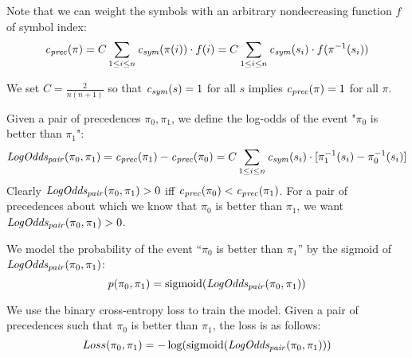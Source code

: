 Note that we can weight the symbols with an arbitrary nondecreasing function $f$ of symbol index:
$$
\CostPrec(\pi) =
C \sum_{1 \leq i \leq n} \CostSym(\pi(i)) \cdot f(i) =
C \sum_{1 \leq i \leq n} \CostSym(s_i) \cdot f(\inv{\pi}(s_i))
$$

We set $C = \frac{2}{n(n+1)}$ so that $\CostSym(s) = 1$ for all $s$ implies $\CostPrec(\pi) = 1$ for all $\pi$.

Given a pair of precedences $\pi_0, \pi_1$,
we define the log-odds of the event "$\pi_0$ is better than $\pi_1$":
$$
\CostPrecPair(\pi_0, \pi_1) =
\CostPrec(\pi_1) - \CostPrec(\pi_0) =
C \sum_{1 \leq i \leq n} \CostSym(s_i) \cdot [\inv{\pi_1}(s_i) - \inv{\pi_0}(s_i)]
$$
Clearly $\CostPrecPair(\pi_0, \pi_1) > 0$ iff $\CostPrec(\pi_0) < \CostPrec(\pi_1)$.
For a pair of precedences about which we know that $\pi_0$ is better than $\pi_1$,
we want $\CostPrecPair(\pi_0, \pi_1) > 0$.

We model the probability of the event ``$\pi_0$ is better than $\pi_1$''
by the sigmoid of $\CostPrecPair(\pi_0, \pi_1)$:
$$
p(\pi_0, \pi_1) = \sigmoid(\CostPrecPair(\pi_0, \pi_1))
$$

We use the binary cross-entropy loss to train the model.
Given a pair of precedences such that $\pi_0$ is better than $\pi_1$,
the loss is as follows:
$$
Loss(\pi_0, \pi_1) = -\log(\sigmoid(\CostPrecPair(\pi_0, \pi_1)))
$$
